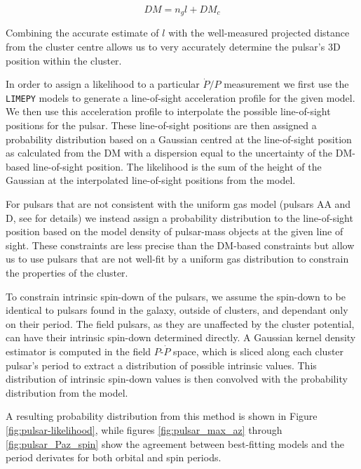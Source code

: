 \begin{equation}
    DM = n_g l + DM_c
    \label{eq:DM-los}
\end{equation}

Combining the accurate estimate of $l$ with the well-measured projected distance from the cluster
centre allows us to very accurately determine the pulsar's 3D position within the cluster.

In order to assign a likelihood to a particular $\dot{P}/P$ measurement we first use the
\texttt{LIMEPY} models to generate a line-of-sight acceleration profile for the given model. We then
use this acceleration profile to interpolate the possible line-of-sight positions for the pulsar.
These line-of-sight positions are then assigned a probability distribution based on a Gaussian
centred at the line-of-sight position as calculated from the DM with a dispersion equal to the
uncertainty of the DM-based line-of-sight position. The likelihood is the sum of the height of the
Gaussian at the interpolated line-of-sight positions from the model.


For pulsars that are not consistent with the uniform gas model (pulsars AA and D, see
\citealt{Abbate2018} for details) we instead assign a probability distribution to the line-of-sight
position based on the model density of pulsar-mass objects at the given line of sight. These
constraints are less precise than the DM-based constraints but allow us to use pulsars that are not
well-fit by a uniform gas distribution to constrain the properties of the cluster.

To constrain intrinsic spin-down of the pulsars, we assume the spin-down to be identical to pulsars
found in the galaxy, outside of clusters, and dependant only on their period. The field pulsars, as
they are unaffected by the cluster potential, can have their intrinsic spin-down determined
directly. A Gaussian kernel density estimator is computed in the field $P$-$\dot{P}$ space, which is
sliced along each cluster pulsar's period to extract a distribution of possible intrinsic values.
This distribution of intrinsic spin-down values is then convolved with the probability distribution
from the model.

A resulting probability distribution from this method is shown in Figure
\ref{fig:pulsar-likelihood}, while figures \ref{fig:pulsar_max_az} through \ref{fig:pulsar_Paz_spin}
show the agreement between best-fitting models and the period derivates for both orbital and spin
periods.

